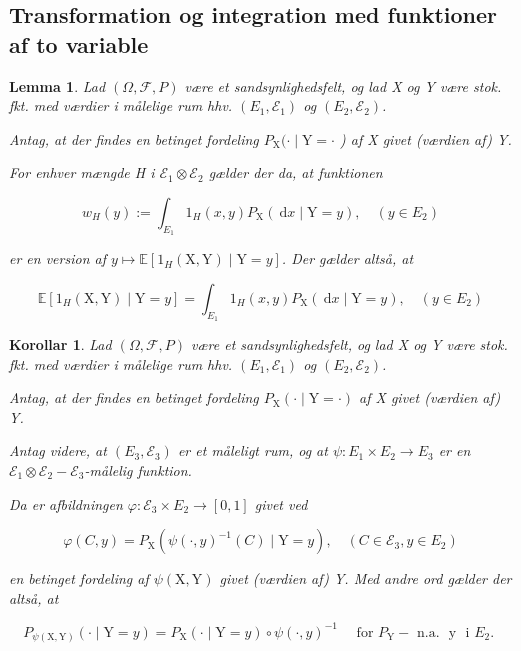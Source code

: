 \documentclass{article}
\newcommand{\1}{\mathbbm{1}}
\theoremstyle{boxed}
\newtheorem{lemma}[theorem]{Lemma}
\newtheorem{corollary}[theorem]{Korollar}
\begin{document}
\subsection{Transformation og integration med funktioner af to variable}
\begin{theorem-box}
    \begin{lemma}
           Lad $(\Omega, \mathcal{F}, P)$ være et sandsynlighedsfelt, og lad X og Y være stok. fkt. med værdier i målelige rum hhv. $\left(E_1, \mathcal{E}_1\right)$ og $\left(E_2, \mathcal{E}_2\right)$.

Antag, at der findes en betinget fordeling $P_{\mathrm{X}}(\cdot \mid \mathrm{Y}=\cdot$ ) af X givet (værdien af) Y.

For enhver mængde H i $\mathcal{E}_1 \otimes \mathcal{E}_2$ gælder der da, at funktionen

$$
w_H(y):=\int_{E_1} 1_H(x, y) P_{\mathrm{X}}(\mathrm{~d} x \mid \mathrm{Y}=y), \quad\left(y \in E_2\right)
$$

er en version af $y \mapsto \mathbb{E}\left[1_H(\mathrm{X}, \mathrm{Y}) \mid \mathrm{Y}=y\right]$.
Der gælder altså, at

$$
\mathbb{E}\left[1_H(\mathrm{X}, \mathrm{Y}) \mid \mathrm{Y}=y\right]=\int_{E_1} 1_H(x, y) P_{\mathrm{X}}(\mathrm{~d} x \mid \mathrm{Y}=y), \quad\left(y \in E_2\right)
$$
     
    \end{lemma}
\end{theorem-box}
\begin{theorem-box}
    \begin{corollary}
        Lad $(\Omega, \mathcal{F}, P)$ være et sandsynlighedsfelt, og lad X og Y være stok. fkt. med værdier i målelige rum hhv. $\left(E_1, \mathcal{E}_1\right)$ og $\left(E_2, \mathcal{E}_2\right)$.

Antag, at der findes en betinget fordeling $P_{\mathrm{X}}(\cdot \mid \mathrm{Y}=\cdot)$ af X givet (værdien af) Y.

Antag videre, at $\left(E_3, \mathcal{E}_3\right)$ er et måleligt rum, og at $\psi: E_1 \times E_2 \rightarrow E_3$ er en $\mathcal{E}_1 \otimes \mathcal{E}_2-\mathcal{E}_3$-målelig funktion.

Da er afbildningen $\varphi: \mathcal{E}_3 \times E_2 \rightarrow[0,1]$ givet ved

$$
\varphi(C, y)=P_{\mathrm{X}}\left(\psi(\cdot, y)^{-1}(C) \mid \mathrm{Y}=y\right), \quad\left(C \in \mathcal{E}_3, y \in E_2\right)
$$

en betinget fordeling af $\psi(\mathrm{X}, \mathrm{Y})$ givet (værdien af) Y.
Med andre ord gælder der altså, at

$$
P_{\psi(\mathrm{X}, \mathrm{Y})}(\cdot \mid \mathrm{Y}=y)=P_{\mathrm{X}}(\cdot \mid \mathrm{Y}=y) \circ \psi(\cdot, y)^{-1} \quad \text { for } P_{\mathrm{Y}}-\text { n.a. } \text { y } \text { i } E_2 \text {. }
$$

    \end{corollary}
\end{theorem-box}
\end{document}
